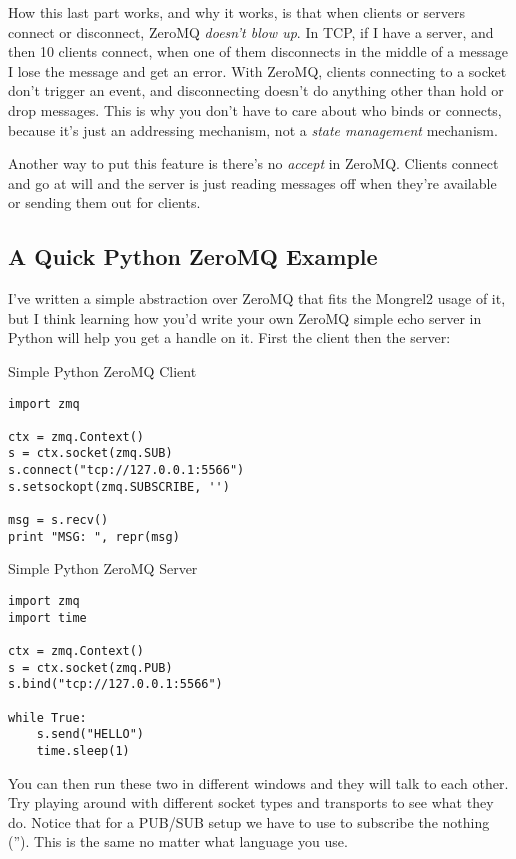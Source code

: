 How this last part works, and why it works, is that when clients or servers
connect or disconnect, ZeroMQ \emph{doesn't blow up}.  In TCP, if I have a
server, and then 10 clients connect, when one of them disconnects in the middle
of a message I lose the message and get an error.  With ZeroMQ, clients
connecting to a socket don't trigger an event, and disconnecting doesn't do
anything other than hold or drop messages.  This is why you don't have to care
about who binds or connects, because it's just an addressing mechanism, not a
\emph{state management} mechanism.

Another way to put this feature is there's no \emph{accept} in ZeroMQ.  Clients
connect and go at will and the server is just reading messages off when they're
available or sending them out for clients.


\subsection{A Quick Python ZeroMQ Example}

I've written a simple abstraction over ZeroMQ that fits the Mongrel2 usage of it, but
I think learning how you'd write your own ZeroMQ simple echo server in Python will
help you get a handle on it.  First the client then the server:

\begin{code}{Simple Python ZeroMQ Client}
\begin{Verbatim}
import zmq

ctx = zmq.Context()
s = ctx.socket(zmq.SUB)
s.connect("tcp://127.0.0.1:5566")
s.setsockopt(zmq.SUBSCRIBE, '')

msg = s.recv()
print "MSG: ", repr(msg)
\end{Verbatim}
\end{code}


\begin{code}{Simple Python ZeroMQ Server}
\begin{Verbatim}
import zmq
import time

ctx = zmq.Context()
s = ctx.socket(zmq.PUB)
s.bind("tcp://127.0.0.1:5566")

while True:
    s.send("HELLO")
    time.sleep(1)
\end{Verbatim}
\end{code}


You can then run these two in different windows and they will talk to each
other.  Try playing around with different socket types and transports to see
what they do.  Notice that for a PUB/SUB setup we have to use 
to subscribe the nothing ('').  This is the same no matter what language you
use.

